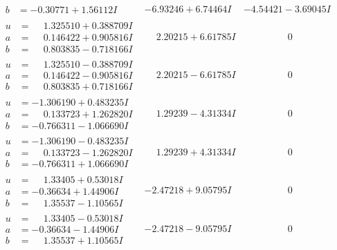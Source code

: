 \documentclass[1p]{elsarticle_modified}
\theoremstyle{definition}
\begin{document}
$$\begin{array}{c|c|c}
\begin{aligned}
b &= -0.30771 + 1.56112 I\end{aligned}
 & -6.93246 + 6.74464 I & -4.54421 - 3.69045 I \\ \hline\begin{aligned}
u &= \phantom{-}1.325510 + 0.388709 I \\
a &= \phantom{-}0.146422 + 0.905816 I \\
b &= \phantom{-}0.803835 - 0.718166 I\end{aligned}
 & \phantom{-}2.20215 + 6.61785 I & \phantom{-0.000000 } 0 \\ \hline\begin{aligned}
u &= \phantom{-}1.325510 - 0.388709 I \\
a &= \phantom{-}0.146422 - 0.905816 I \\
b &= \phantom{-}0.803835 + 0.718166 I\end{aligned}
 & \phantom{-}2.20215 - 6.61785 I & \phantom{-0.000000 } 0 \\ \hline\begin{aligned}
u &= -1.306190 + 0.483235 I \\
a &= \phantom{-}0.133723 + 1.262820 I \\
b &= -0.766311 - 1.066690 I\end{aligned}
 & \phantom{-}1.29239 - 4.31334 I & \phantom{-0.000000 } 0 \\ \hline\begin{aligned}
u &= -1.306190 - 0.483235 I \\
a &= \phantom{-}0.133723 - 1.262820 I \\
b &= -0.766311 + 1.066690 I\end{aligned}
 & \phantom{-}1.29239 + 4.31334 I & \phantom{-0.000000 } 0 \\ \hline\begin{aligned}
u &= \phantom{-}1.33405 + 0.53018 I \\
a &= -0.36634 + 1.44906 I \\
b &= \phantom{-}1.35537 - 1.10565 I\end{aligned}
 & -2.47218 + 9.05795 I & \phantom{-0.000000 } 0 \\ \hline\begin{aligned}
u &= \phantom{-}1.33405 - 0.53018 I \\
a &= -0.36634 - 1.44906 I \\
b &= \phantom{-}1.35537 + 1.10565 I\end{aligned}
 & -2.47218 - 9.05795 I & \phantom{-0.000000 } 0 \\ \hline\begin{aligned}

\end{aligned}
\end{array}$$
\end{document}

